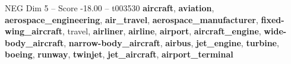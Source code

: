 \begin{textsample}{NEG Dim 5 – Score -18.00 – t003530}  \label{ex:f5_neg_016}
\textbf{aircraft}, \textbf{aviation}, \textbf{aerospace\_engineering}, \textbf{air\_travel}, \textbf{aerospace\_manufacturer}, \textbf{fixed-wing\_aircraft}, travel, \textbf{airliner}, \textbf{airline}, \textbf{airport}, \textbf{aircraft\_engine}, \textbf{wide-body\_aircraft}, \textbf{narrow-body\_aircraft}, \textbf{airbus}, \textbf{jet\_engine}, \textbf{turbine}, \textbf{boeing}, \textbf{runway}, \textbf{twinjet}, \textbf{jet\_aircraft}, \textbf{airport\_terminal}

\end{textsample}
